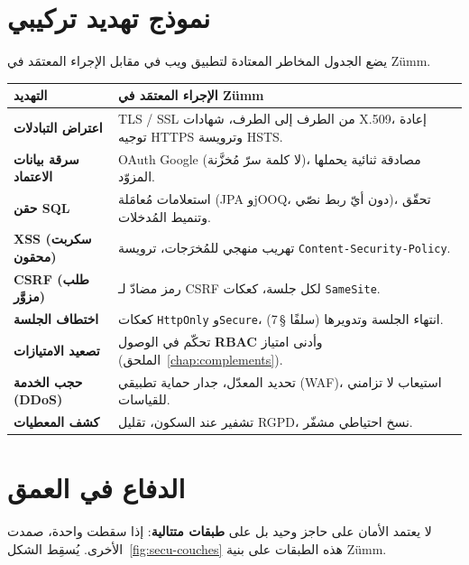 \section{نموذج تهديد تركيبي}
يضع الجدول المخاطر المعتادة لتطبيق ويب في مقابل الإجراء المعتمَد في Zümm.
\begin{xltabular}{\textwidth}{>{\bfseries}p{4cm} X}
\toprule
\textbf{التهديد} & \textbf{الإجراء المعتمَد في Zümm} \\
\midrule
\endhead
اعتراض التبادلات & TLS / SSL من الطرف إلى الطرف، شهادات X.509، إعادة توجيه HTTPS وترويسة HSTS. \\
سرقة بيانات الاعتماد & OAuth Google (لا كلمة سرّ مُخزَّنة)، مصادقة ثنائية يحملها المزوّد. \\
حقن SQL & استعلامات مُعامَلة (JPA وjOOQ، دون أيّ ربط نصّي)، تحقّق وتنميط المُدخلات. \\
XSS (سكربت محقون) & تهريب منهجي للمُخرَجات، ترويسة \texttt{Content-Security-Policy}. \\
CSRF (طلب مزوَّر) & رمز مضادّ لـ CSRF لكل جلسة، كعكات \texttt{SameSite}. \\
اختطاف الجلسة & كعكات \texttt{HttpOnly} و\texttt{Secure}، انتهاء الجلسة وتدويرها (سلفًا §\,7). \\
تصعيد الامتيازات & تحكّم في الوصول \textbf{RBAC} وأدنى امتياز (الملحق~\ref{chap:complements}). \\
حجب الخدمة (DDoS) & تحديد المعدّل، جدار حماية تطبيقي (WAF)، استيعاب لا تزامني للقياسات. \\
كشف المعطيات & تشفير عند السكون، تقليل RGPD، نسخ احتياطي مشفّر. \\
\bottomrule
\end{xltabular}

\section{الدفاع في العمق}
لا يعتمد الأمان على حاجز وحيد بل على \textbf{طبقات متتالية}: إذا سقطت واحدة،
صمدت الأخرى. يُسقِط الشكل~\ref{fig:secu-couches} هذه الطبقات على بنية Zümm.

